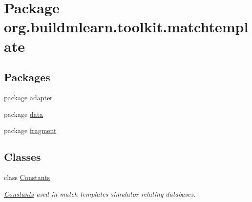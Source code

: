 \hypertarget{namespaceorg_1_1buildmlearn_1_1toolkit_1_1matchtemplate}{}\section{Package org.\+buildmlearn.\+toolkit.\+matchtemplate}
\label{namespaceorg_1_1buildmlearn_1_1toolkit_1_1matchtemplate}
\subsection*{Packages}
\begin{DoxyCompactItemize}
\item 
package \hyperlink{namespaceorg_1_1buildmlearn_1_1toolkit_1_1matchtemplate_1_1adapter}{adapter}
\item 
package \hyperlink{namespaceorg_1_1buildmlearn_1_1toolkit_1_1matchtemplate_1_1data}{data}
\item 
package \hyperlink{namespaceorg_1_1buildmlearn_1_1toolkit_1_1matchtemplate_1_1fragment}{fragment}
\end{DoxyCompactItemize}
\subsection*{Classes}
\begin{DoxyCompactItemize}
\item 
class \hyperlink{classorg_1_1buildmlearn_1_1toolkit_1_1matchtemplate_1_1Constants}{Constants}
\begin{DoxyCompactList}\small\item\em \hyperlink{classorg_1_1buildmlearn_1_1toolkit_1_1matchtemplate_1_1Constants}{Constants} used in match template\textquotesingle{}s simulator relating databases. \end{DoxyCompactList}\end{DoxyCompactItemize}
